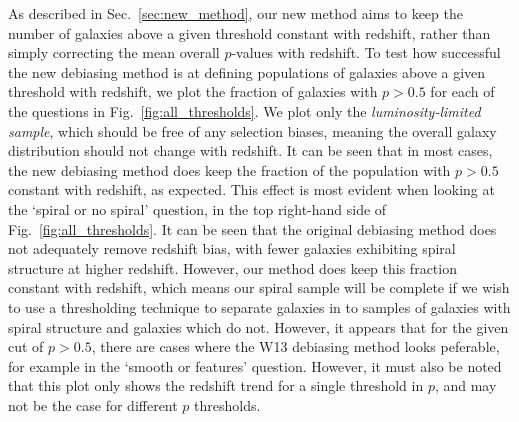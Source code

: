 \documentclass[useAMS,usenatbib]{mn2e}
\begin{document}
As described in Sec.~\ref{sec:new_method}, our new method aims to keep the number of galaxies above a given threshold constant with redshift, rather than simply correcting the mean overall $p$-values with redshift. To test how successful the new debiasing method is at defining populations of galaxies above a given threshold with redshift, we plot the fraction of galaxies with $p>0.5$ for each of the questions in Fig.~\ref{fig:all_thresholds}. We plot only the \textit{luminosity-limited sample}, which should be free of any selection biases, meaning the overall galaxy distribution should not change with redshift. It can be seen that in most cases, the new debiasing method does keep the fraction of the population with $p>0.5$ constant with redshift, as expected. This effect is most evident when looking at the `spiral or no spiral' question, in the top right-hand side of Fig.~\ref{fig:all_thresholds}. It can be seen that the original debiasing method does not adequately remove redshift bias, with fewer galaxies exhibiting spiral structure at higher redshift. However, our  method does keep this fraction constant with redshift, which means our spiral sample will be complete if we wish to use a thresholding technique to separate galaxies in to samples of galaxies with spiral structure and galaxies which do not. However, it appears that for the given cut of $p>0.5$, there are cases where the W13 debiasing method looks peferable, for example in the `smooth or features' question. However, it must also be noted that this plot only shows the redshift trend for a single threshold in $p$, and may not be the case for different $p$ thresholds.
\end{document}
